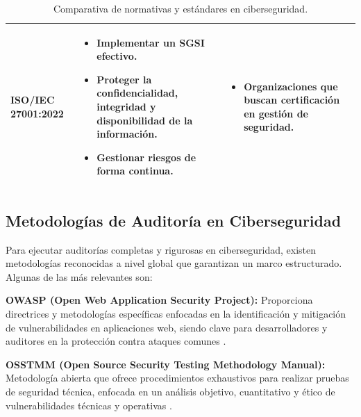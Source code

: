 \documentclass[a4paper, 10pt]{article}
\begin{document}
\begin{table}[H]
\begin{tabular}{|p{2.5cm}|p{7.5cm}|p{5.5cm}|}
ISO/IEC 27001:2022 & \begin{itemize} \item Implementar un SGSI efectivo. \item Proteger la confidencialidad, integridad y disponibilidad de la información. \item Gestionar riesgos de forma continua. \end{itemize} & \begin{itemize} \item Organizaciones que buscan certificación en gestión de seguridad. \end{itemize} \\ \hline
\end{tabular}
\caption{Comparativa de normativas y estándares en ciberseguridad.}
\label{tabla:normativas}
\end{table}


\par\vspace{0.5cm}


\subsection{Metodologías de Auditoría en Ciberseguridad}
\par\vspace{0.5cm}

Para ejecutar auditorías completas y rigurosas en ciberseguridad, existen metodologías reconocidas a nivel global que garantizan un marco estructurado. Algunas de las más relevantes son:
\par\vspace{0.5cm}

\textbf{OWASP (Open Web Application Security Project):} Proporciona directrices y metodologías específicas enfocadas en la identificación y mitigación de vulnerabilidades en aplicaciones web, siendo clave para desarrolladores y auditores en la protección contra ataques comunes \cite{owasp}.
\par\vspace{0.5cm}

\textbf{OSSTMM (Open Source Security Testing Methodology Manual):} Metodología abierta que ofrece procedimientos exhaustivos para realizar pruebas de seguridad técnica, enfocada en un análisis objetivo, cuantitativo y ético de vulnerabilidades técnicas y operativas \cite{osstmm}.
\par\vspace{0.5cm}
\end{document}
